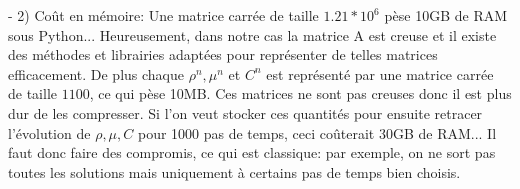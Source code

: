 \documentclass[11pt]{article}
\begin{document}
\begin{paragraph}
- 2) Coût en mémoire: Une matrice carrée de taille $1.21*10^6$ pèse 10GB de RAM sous Python... Heureusement, dans notre cas la matrice A est creuse et il existe des méthodes et librairies adaptées pour représenter de telles matrices efficacement. De plus chaque $\rho^n,\mu^n$ et $C^n$ est représenté par une matrice carrée de taille $1100$, ce qui pèse 10MB. Ces matrices ne sont pas creuses donc il est plus dur de les compresser. Si l'on veut stocker ces quantités pour ensuite retracer l’évolution de $\rho,\mu,C$ pour 1000 pas de temps, ceci coûterait 30GB de RAM... Il faut donc faire des compromis, ce qui est classique: par exemple, on ne sort pas toutes les solutions mais uniquement à certains pas de temps bien choisis.
\end{paragraph}
\ifdefined\COMPLETE
\else
\end{document}
